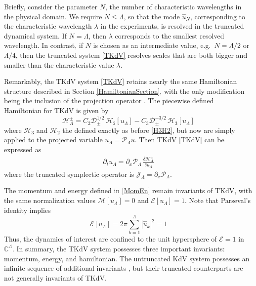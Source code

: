 \documentclass[11pt]{article}
\newcommand{\abs}[1]{\left| #1 \right|}
\newcommand{\CC}{{\mathbb{C}}}
\newcommand{\lam}{\lambda}
\newcommand{\lamfac}{N}
\newcommand{\drat}{\mathcal{D}}
\newcommand{\dratupdn}{\drat_{\pm}}
\newcommand{\En}{\mathcal{E}}
\newcommand{\Mo}{\mathcal{M}}
\newcommand{\uhat}{\hat{u}}
\newcommand{\sympJ}{\mathcal{J}}
\newcommand{\vard}[2]{\frac{\delta #1}{\delta #2}}
\newcommand{\Ham}{\mathcal{H}}
\newcommand{\Hthree}{\Ham_{3}}
\newcommand{\Htwo}{\Ham_{2}}
\newcommand{\Proj}{\mathcal{P}_{\Lambda}}
\newcommand{\uL}{u_{\Lambda}}
\newcommand{\HLupdn}{\Ham_{\Lambda}^{\pm}}
\newcommand{\SympL}{\sympJ_{\Lambda}}
\begin{document}
Briefly, consider the parameter $\lamfac$, the number of characteristic wavelengths in the physical domain. We require $\lamfac \le \Lambda$, so that the mode $\uhat_{\lamfac}$, corresponding to the characteristic wavelength $\lam$ in the experiments, is resolved in the truncated dynamical system. If $\lamfac = \Lambda$, then $\lam$ corresponds to the smallest resolved wavelength. In contrast, if $\lamfac$ is chosen as an intermediate value, e.g.~$\lamfac = \Lambda/2$ or $\Lambda/4$, then the truncated system \eqref{TKdV} resolves scales that are both bigger and smaller than the characteristic value $\lam$.

Remarkably, the TKdV system \eqref{TKdV} retains nearly the same Hamiltonian structure described in Section \ref{HamiltonianSection}, with the only modification being the inclusion of the projection operator \cite{bajars2013weakly, majda2019}. The piecewise defined Hamiltonian for TKdV is given by
\begin{equation}
\label{TruncHamiltonian}
\HLupdn = C_2 \dratupdn^{1/2} \, \Htwo[\uL] - C_3 \dratupdn^{-3/2} \, \Hthree[\uL]
\end{equation}
where $\Hthree$ and $\Htwo$ the defined exactly as before \eqref{H3H2}, but now are simply applied to the projected variable $\uL = \Proj u$.
Then TKdV \eqref{TKdV} can be expressed as
\begin{align}
\partial_t {\uL} = \partial_x \Proj \, \vard{\HLupdn}{\uL}
\end{align}
where the truncated symplectic operator is $\SympL = \partial_x \Proj$.

The momentum and energy defined in \eqref{MomEn} remain invariants of TKdV, with the same normalization values $\Mo[\uL] = 0$ and $\En[\uL] = 1$. Note that Parseval's identity implies
\begin{equation}
\En[\uL] = 2 \pi \sum_{k=1}^{\Lambda} \abs{\uhat_k}^2 = 1
\end{equation}
Thus, the dynamics of interest are confined to the unit hypersphere of $\En = 1$ in $\CC^{\Lambda}$.
%
In summary, the TKdV system possesses three important invariants: momentum, energy, and hamiltonian. The untruncated KdV system possesses an infinite sequence of additional invariants \cite{lax1975periodic, whitham2011linear}, but their truncated counterparts are not generally invariants of TKdV.
\end{document}
